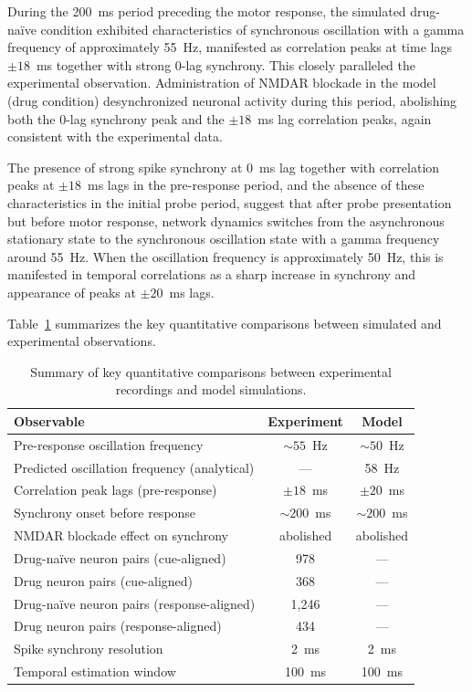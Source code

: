 \documentclass[12pt]{article}
\begin{document}
During the 200~ms period preceding the motor response, the simulated drug-na\"ive condition exhibited characteristics of synchronous oscillation with a gamma frequency of approximately 55~Hz, manifested as correlation peaks at time lags $\pm 18$~ms together with strong 0-lag synchrony. This closely paralleled the experimental observation. Administration of NMDAR blockade in the model (drug condition) desynchronized neuronal activity during this period, abolishing both the 0-lag synchrony peak and the $\pm 18$~ms lag correlation peaks, again consistent with the experimental data.

The presence of strong spike synchrony at 0~ms lag together with correlation peaks at $\pm 18$~ms lags in the pre-response period, and the absence of these characteristics in the initial probe period, suggest that after probe presentation but before motor response, network dynamics switches from the asynchronous stationary state to the synchronous oscillation state with a gamma frequency around 55~Hz. When the oscillation frequency is approximately 50~Hz, this is manifested in temporal correlations as a sharp increase in synchrony and appearance of peaks at $\pm 20$~ms lags.

Table~\ref{tab:comparison} summarizes the key quantitative comparisons between simulated and experimental observations.

\begin{table}[htbp]
\centering
\caption{Summary of key quantitative comparisons between experimental recordings and model simulations.}
\label{tab:comparison}
\begin{tabular}{lcc}
\toprule
\textbf{Observable} & \textbf{Experiment} & \textbf{Model} \\
\midrule
Pre-response oscillation frequency & ${\sim}55$~Hz & ${\sim}50$~Hz \\
Predicted oscillation frequency (analytical) & --- & 58~Hz \\
Correlation peak lags (pre-response) & $\pm 18$~ms & $\pm 20$~ms \\
Synchrony onset before response & ${\sim}200$~ms & ${\sim}200$~ms \\
NMDAR blockade effect on synchrony & abolished & abolished \\
Drug-na\"ive neuron pairs (cue-aligned) & 978 & --- \\
Drug neuron pairs (cue-aligned) & 368 & --- \\
Drug-na\"ive neuron pairs (response-aligned) & 1{,}246 & --- \\
Drug neuron pairs (response-aligned) & 434 & --- \\
Spike synchrony resolution & 2~ms & 2~ms \\
Temporal estimation window & 100~ms & 100~ms \\
\bottomrule
\end{tabular}
\end{table}
\end{document}
